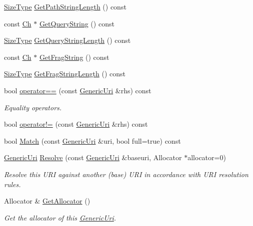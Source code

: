\begin{DoxyCompactItemize}
\item 
\hyperlink{rapidjson_8h_a5ed6e6e67250fadbd041127e6386dcb5}{Size\+Type} \hyperlink{classGenericUri_a7d6e5a13cb64cb5b65439bfd9ea82674}{Get\+Path\+String\+Length} () const
\item 
const \hyperlink{classGenericUri_a20d0602cff62211d89bc4b25963beeee}{Ch} $\ast$ \hyperlink{classGenericUri_a305864abbde795e2864ae01f5c299071}{Get\+Query\+String} () const
\item 
\hyperlink{rapidjson_8h_a5ed6e6e67250fadbd041127e6386dcb5}{Size\+Type} \hyperlink{classGenericUri_a6ef50d8c3d2d57ce653d88f0fb6297ce}{Get\+Query\+String\+Length} () const
\item 
const \hyperlink{classGenericUri_a20d0602cff62211d89bc4b25963beeee}{Ch} $\ast$ \hyperlink{classGenericUri_a03ad0639273683a6f0141156e68d02ab}{Get\+Frag\+String} () const
\item 
\hyperlink{rapidjson_8h_a5ed6e6e67250fadbd041127e6386dcb5}{Size\+Type} \hyperlink{classGenericUri_a808ac934c8cb8aaf57f63b216a40a9b9}{Get\+Frag\+String\+Length} () const
\item 
bool \hyperlink{classGenericUri_aa2a0b3b540a2736ba253feddf848ff46}{operator==} (const \hyperlink{classGenericUri}{Generic\+Uri} \&rhs) const
\begin{DoxyCompactList}\small\item\em Equality operators. \end{DoxyCompactList}\item 
bool \hyperlink{classGenericUri_af220805902de60eda9f4286c017c9c95}{operator!=} (const \hyperlink{classGenericUri}{Generic\+Uri} \&rhs) const
\item 
bool \hyperlink{classGenericUri_a1a35d339917489a66064d21642788aab}{Match} (const \hyperlink{classGenericUri}{Generic\+Uri} \&uri, bool full=true) const
\item 
\hyperlink{classGenericUri}{Generic\+Uri} \hyperlink{classGenericUri_a7de4b3a28c8046f2293658bc9c0b44e1}{Resolve} (const \hyperlink{classGenericUri}{Generic\+Uri} \&baseuri, Allocator $\ast$allocator=0)
\begin{DoxyCompactList}\small\item\em Resolve this U\+RI against another (base) U\+RI in accordance with U\+RI resolution rules. \end{DoxyCompactList}\item 
Allocator \& \hyperlink{classGenericUri_a7dfc2c65b606611f2f19292f375c741a}{Get\+Allocator} ()
\begin{DoxyCompactList}\small\item\em Get the allocator of this \hyperlink{classGenericUri}{Generic\+Uri}. \end{DoxyCompactList}\end{DoxyCompactItemize}

